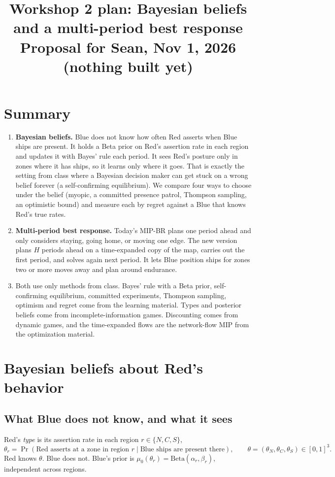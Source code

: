 \documentclass[10pt]{article}
\title{\vspace{-2.5em}\textbf{Workshop 2 plan: Bayesian beliefs and a multi-period best response}\\[2pt]
\large Proposal for Sean, Nov 1, 2026 (nothing built yet)}
\date{\vspace{-3em}}
\newcommand{\1}{\mathbf{1}}
\begin{document}
\maketitle

\section*{Summary}
\begin{enumerate}
\item \textbf{Bayesian beliefs.} Blue does not know how often Red asserts when Blue ships are present. It holds a
Beta prior on Red's assertion rate in each region and updates it with Bayes' rule each period. It sees Red's
posture only in zones where it has ships, so it learns only where it goes. That is exactly the setting from class
where a Bayesian decision maker can get stuck on a wrong belief forever (a self-confirming equilibrium). We compare
four ways to choose under the belief (myopic, a committed presence patrol, Thompson sampling, an optimistic bound) and
measure each by regret against a Blue that knows Red's true rates.
\item \textbf{Multi-period best response.} Today's MIP-BR plans one period ahead and only considers staying, going
home, or moving one edge. The new version plans $H$ periods ahead on a time-expanded copy of the map, carries out
the first period, and solves again next period. It lets Blue position ships for zones two or more moves away and
plan around endurance.
\item Both use only methods from class. Bayes' rule with a Beta prior, self-confirming equilibrium, committed
experiments, Thompson sampling, optimism and regret come from the learning material. Types and posterior beliefs
come from incomplete-information games. Discounting comes from dynamic games, and the time-expanded flows are the
network-flow MIP from the optimization material.
\end{enumerate}

\section{Bayesian beliefs about Red's behavior}

\subsection{What Blue does not know, and what it sees}
Red's \emph{type} is its assertion rate in each region $r\in\{N,C,S\}$,
\[
\theta_r=\Pr(\text{Red asserts at a zone in region } r \mid \text{Blue ships are present there}),\qquad
\theta=(\theta_N,\theta_C,\theta_S)\in[0,1]^3 .
\]
Red knows $\theta$. Blue does not. Blue's prior is $\mu_0(\theta_r)=\mathrm{Beta}(\alpha_r,\beta_r)$, independent
across regions.
\end{document}
